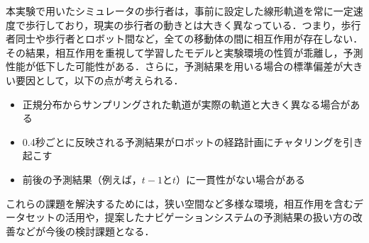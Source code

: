 本実験で用いたシミュレータの歩行者は，事前に設定した線形軌道を常に一定速度で歩行しており，現実の歩行者の動きとは大きく異なっている．つまり，歩行者同士や歩行者とロボット間など，全ての移動体の間に相互作用が存在しない．その結果，相互作用を重視して学習したモデルと実験環境の性質が乖離し，予測性能が低下した可能性がある．さらに，予測結果を用いる場合の標準偏差が大きい要因として，以下の点が考えられる．
\begin{itemize}
  \item 正規分布からサンプリングされた軌道が実際の軌道と大きく異なる場合がある
  \item 0.4秒ごとに反映される予測結果がロボットの経路計画にチャタリングを引き起こす
  \item 前後の予測結果（例えば，$t-1\text{と}t$）に一貫性がない場合がある
\end{itemize}
これらの課題を解決するためには，狭い空間など多様な環境，相互作用を含むデータセットの活用や，提案したナビゲーションシステムの予測結果の扱い方の改善などが今後の検討課題となる．

\newpage
